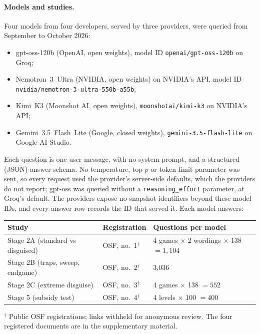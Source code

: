 \documentclass[10pt]{article}
\theoremstyle{definition}
\theoremstyle{remark}
\begin{document}
\paragraph{Models and studies.} Four models from four developers, served by three providers,
were queried from September to October 2026:
\begin{itemize}
\item gpt-oss-120b (OpenAI, open weights), model ID \nolinkurl{openai/gpt-oss-120b} on Groq;
\item Nemotron~3~Ultra (NVIDIA, open weights) on NVIDIA's API, model ID\\
  \nolinkurl{nvidia/nemotron-3-ultra-550b-a55b};
\item Kimi~K3 (Moonshot AI, open weights), \nolinkurl{moonshotai/kimi-k3} on NVIDIA's API;
\item Gemini~3.5~Flash~Lite (Google, closed weights), \nolinkurl{gemini-3.5-flash-lite} on Google
  AI Studio.
\end{itemize}
Each question is one user message, with no system prompt, and a structured (JSON) answer
schema. No temperature, top-$p$ or token-limit parameter was sent, so every request used the
provider's server-side defaults, which the providers do not report; gpt-oss was queried without a
\texttt{reasoning\_effort} parameter, at Groq's default. The providers expose no snapshot
identifiers beyond these model IDs, and every answer row records the ID that served it. Each
model answers:

\begin{center}
\small
\begin{tabular}{@{}lll@{}}
\toprule
Study & Registration & Questions per model \\
\midrule
Stage 2A (standard vs disguised) & OSF, no.~1$^\dagger$ & 4 games $\times$ 2 wordings $\times$ 138 $=1{,}104$ \\
Stage 2B (traps, sweep, endgame) & OSF, no.~2$^\dagger$ & 3{,}036 \\
Stage 2C (extreme disguise) & OSF, no.~3$^\dagger$ & 4 games $\times$ 138 $=552$ \\
Stage 5 (subsidy test) & OSF, no.~4$^\dagger$ & 4 levels $\times$ 100 $=400$ \\
\bottomrule
\end{tabular}

\smallskip
{\footnotesize $^\dagger$ Public OSF registrations; links withheld for anonymous review. The four
registered documents are in the supplementary material.}
\end{center}
\end{document}
